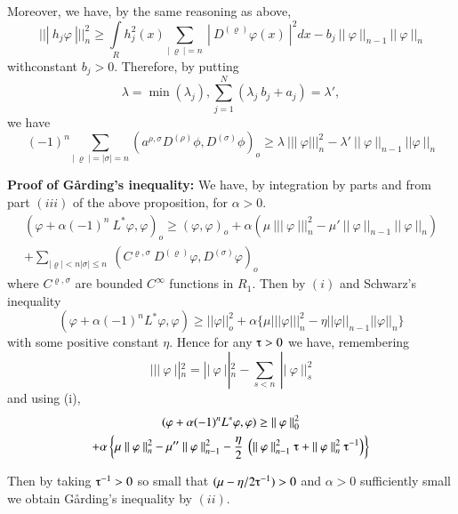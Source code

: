 Moreover, we have, by the same reasoning as above, 
$$
||| ~ h_j \varphi ~ |||^2_n \ge \int\limits_{R} h^2_j(x) \sum_{|~
 \varrho ~ | = n} ~ | ~ D^{(\varrho)} \varphi(x) ~ |^2 dx - b_j ~ ||
~\varphi ~ ||_{n-1} ~ || ~ \varphi ~ ||_n 
$$
with\pageoriginale constant $b_j > 0$. Therefore, by putting
$$
\lambda = \min (\lambda_j), \sum_{j=1}^{N} (\lambda_j ~ b_j + a_j) =
\lambda', 
$$
we have
$$
(-1)^n \sum_{| ~ \varrho ~ | = | \sigma | = n} (a^{\rho, \sigma}
D^{(\rho)} \phi, D^{(\sigma)}\phi)_o \ge \lambda ~ ||| ~
\varphi |||^2_n - \lambda' ~|| ~ \varphi ~ ||_{n-1} ~ || \varphi ~
||_n 
$$

\noindent \textbf{Proof of G\r{a}rding's inequality:}
 We have, by integration by parts and from part $(iii)$ of the above
 proposition, for $\alpha > 0$. 
\begin{multline*}
 (\varphi + \alpha (-1)^n ~ L^*\varphi,\varphi)_o \ge
 (\varphi,\varphi)_o + \alpha (\mu ~||| ~ \varphi ~ |||^2_n - \mu' ~
 ||~ \varphi ~ ||_{n-1} ~ || ~ \varphi ~ ||_n)\\ 
 + \sum_{|\varrho | < n
  | \sigma | \le n} ~ (C^{\varrho,\sigma} ~D^{(\varrho)} \varphi,
 D^{(\sigma)}\varphi)_o 
\end{multline*}
where $C^{\varrho,\sigma}$ are bounded $C^\infty$ functions in
$R_1$. Then by $(i)$ and Schwarz's inequality 
$$
(\varphi + \alpha (-1)^n L^* \varphi,\varphi) \ge ||\varphi||^2_o +
\alpha\{\mu ||| \varphi|||^2_n - \eta || \varphi ||_{n-1} || \varphi
||_n \} 
$$
with some positive constant $\eta$. Hence for any $\tauup > 0$ we
have, remembering 
$$
|||~ \varphi ~ ||^2_n = || ~ \varphi ~ ||^2_n - \sum_{s < n} ~ ||
~\varphi ~ ||^2_s 
$$
and using (i),
\begin{multline*}
 (\varphi + \alpha(-1)^n L^* \varphi,\varphi) \ge || ~ \varphi ~ ||^2_0\\
 + \alpha \left\{\mu ~ || ~ \varphi ~ ||^2_n - \mu'' ~||~ \varphi ~
 ||^2_{n-1} - \frac{\eta}{2} ~ \left(|| ~ \varphi ~ ||^2_{n-1} ~ \tauup + ||
 ~ \varphi ~ ||^2_n ~ \tauup^{-1}\right)\right\} 
\end{multline*}

Then by taking $\tauup^{-1} > 0$ so small that $(\mu - \eta/2
\tauup^{-1}) > 0$ and $\alpha > 0$ sufficiently small we obtain
G\r{a}rding's inequality by $(ii)$. 
